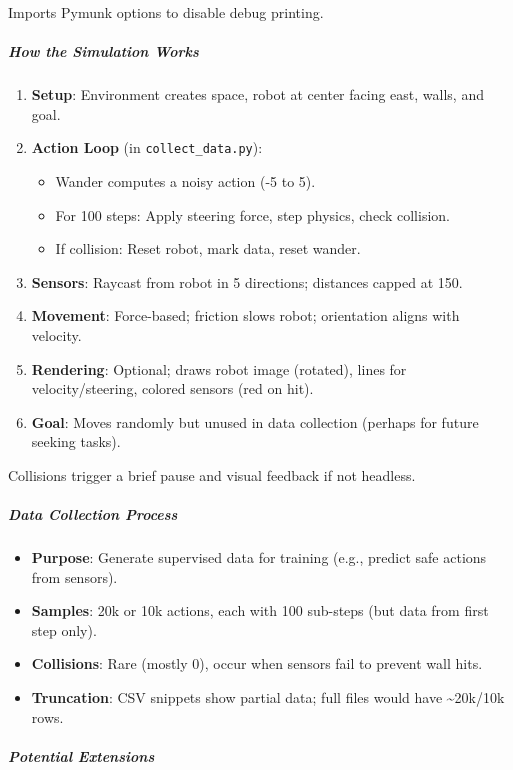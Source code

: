 Imports Pymunk options to disable debug printing.

\subparagraph{How the Simulation Works}

\begin{enumerate}
\item \textbf{Setup}: Environment creates space, robot at center facing east, walls, and goal.
\item \textbf{Action Loop} (in \texttt{collect\_data.py}):

\begin{itemize}
\item Wander computes a noisy action (-5 to 5).
\item For 100 steps: Apply steering force, step physics, check collision.
\item If collision: Reset robot, mark data, reset wander.
\end{itemize}


\item \textbf{Sensors}: Raycast from robot in 5 directions; distances capped at 150.
\item \textbf{Movement}: Force-based; friction slows robot; orientation aligns with velocity.
\item \textbf{Rendering}: Optional; draws robot image (rotated), lines for velocity/steering, colored sensors (red on hit).
\item \textbf{Goal}: Moves randomly but unused in data collection (perhaps for future seeking tasks).
\end{enumerate}

Collisions trigger a brief pause and visual feedback if not headless.

\subparagraph{Data Collection Process}

\begin{itemize}
\item \textbf{Purpose}: Generate supervised data for training (e.g., predict safe actions from sensors).
\item \textbf{Samples}: 20k or 10k actions, each with 100 sub-steps (but data from first step only).
\item \textbf{Collisions}: Rare (mostly 0), occur when sensors fail to prevent wall hits.
\item \textbf{Truncation}: CSV snippets show partial data; full files would have {\textasciitilde}20k/10k rows.
\end{itemize}

\subparagraph{Potential Extensions}

